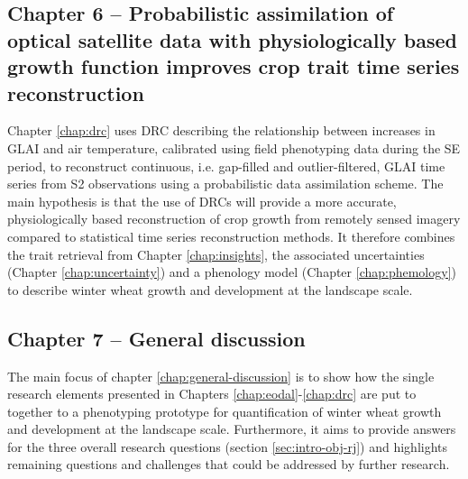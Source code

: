 \subsection*{Chapter 6 -- Probabilistic assimilation of optical satellite data with physiologically based growth function improves crop trait time series reconstruction}
Chapter \ref{chap:drc} uses \gls{DRC} describing the relationship between increases in \gls{GLAI} and air temperature, calibrated using field phenotyping data during the \gls{SE} period, to reconstruct continuous, i.e. gap-filled and outlier-filtered, \gls{GLAI} time series from \gls{S2} observations using a probabilistic data assimilation scheme. The main hypothesis is that the use of \gls{DRC}s will provide a more accurate, physiologically based reconstruction of crop growth from remotely sensed imagery compared to statistical time series reconstruction methods. It therefore combines the trait retrieval from Chapter \ref{chap:insights}, the associated uncertainties (Chapter \ref{chap:uncertainty}) and a phenology model (Chapter \ref{chap:phemology}) to describe winter wheat growth and development at the landscape scale.

\subsection*{Chapter 7 -- General discussion}
The main focus of chapter \ref{chap:general-discussion} is to show how the single research elements presented in Chapters \ref{chap:eodal}-\ref{chap:drc} are put to together to a phenotyping prototype for quantification of winter wheat growth and development at the landscape scale. Furthermore, it aims to provide answers for the three overall research questions (section \ref{sec:intro-obj-rj}) and highlights remaining questions and challenges that could be addressed by further research.
